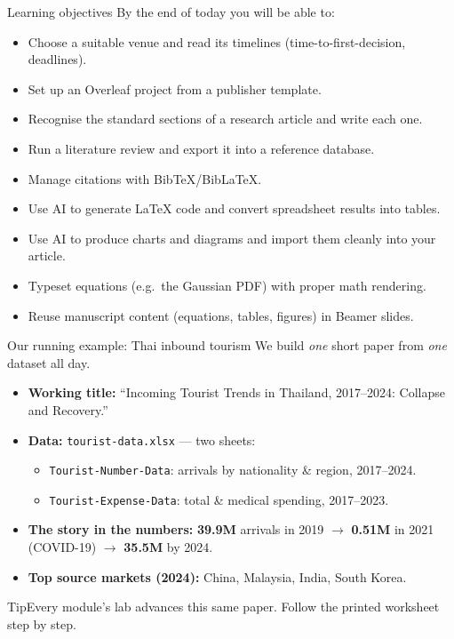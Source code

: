 \documentclass[aspectratio=169,11pt]{beamer}
\newcommand{\tipbox}[1]{\begin{block}{Tip}#1\end{block}}
\begin{document}
\begin{frame}{Learning objectives}
  By the end of today you will be able to:
  \begin{itemize}
    \item Choose a suitable venue and read its timelines (time-to-first-decision, deadlines).
    \item Set up an Overleaf project from a publisher template.
    \item Recognise the standard sections of a research article and write each one.
    \item Run a literature review and export it into a reference database.
    \item Manage citations with BibTeX/BibLaTeX.
    \item Use AI to generate LaTeX code and convert spreadsheet results into tables.
    \item Use AI to produce charts and diagrams and import them cleanly into your article.
    \item Typeset equations (e.g.\ the Gaussian PDF) with proper math rendering.
    \item Reuse manuscript content (equations, tables, figures) in Beamer slides.
  \end{itemize}
\end{frame}

\begin{frame}{Our running example: Thai inbound tourism}
  We build \emph{one} short paper from \emph{one} dataset all day.
  \begin{itemize}
    \item \textbf{Working title:} ``Incoming Tourist Trends in Thailand, 2017--2024: Collapse and Recovery.''
    \item \textbf{Data:} \texttt{tourist-data.xlsx} --- two sheets:
    \begin{itemize}
      \item \texttt{Tourist-Number-Data}: arrivals by nationality \& region, 2017--2024.
      \item \texttt{Tourist-Expense-Data}: total \& medical spending, 2017--2023.
    \end{itemize}
    \item \textbf{The story in the numbers:} \textbf{39.9M} arrivals in 2019 $\rightarrow$ \textbf{0.51M} in 2021 (COVID-19) $\rightarrow$ \textbf{35.5M} by 2024.
    \item \textbf{Top source markets (2024):} China, Malaysia, India, South Korea.
  \end{itemize}
  \tipbox{Every module's lab advances this same paper. Follow the printed worksheet step by step.}
\end{frame}
\end{document}
